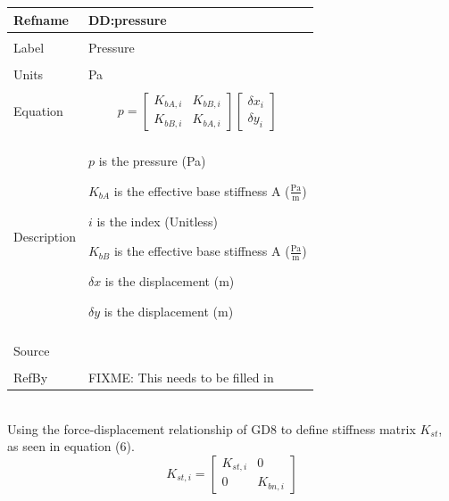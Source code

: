 \documentclass[12pt]{article}
\begin{document}
\noindent \begin{minipage}{\textwidth}
\begin{tabular}{p{} p{}}
\toprule \textbf{Refname} & \textbf{DD:pressure}
\label{DD:pressure}
\\ \midrule \\
Label & Pressure
\\ \midrule \\
Units & Pa
\\ \midrule \\
Equation & \begin{dmath}
           p=\begin{bmatrix}
{K_{bA,i}} & {K_{bB,i}}\\
{K_{bB,i}} & {K_{bA,i}}
\end{bmatrix} \begin{bmatrix}
{δx}_{i}\\
{δy}_{i}
\end{bmatrix}
	   \end{dmath}
\\ \midrule \\
Description & \begin{symbDescription}
              \item{$p$ is the pressure (Pa)}
              \item{${K_{bA}}$ is the effective base stiffness A ($\frac{\text{Pa}}{\text{m}}$)}
              \item{$i$ is the index (Unitless)}
              \item{${K_{bB}}$ is the effective base stiffness A ($\frac{\text{Pa}}{\text{m}}$)}
              \item{$δx$ is the displacement (m)}
              \item{$δy$ is the displacement (m)}
              \end{symbDescription}
\\ \midrule \\
Source &
\\ \midrule \\
RefBy & FIXME: This needs to be filled in
\\ \bottomrule \end{tabular}
\end{minipage}\\
Using the force-displacement relationship of GD8 to define stiffness matrix ${K_{st}}$, as seen in equation (6).
\begin{dmath}
{K_{st,i}}=\begin{bmatrix}
{K_{st,i}} & 0\\
0 & {K_{bn,i}}
\end{bmatrix}
\end{dmath}
\end{document}
